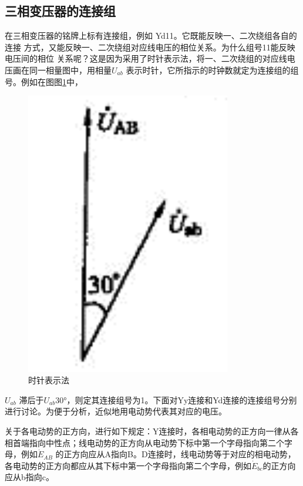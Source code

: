 \documentclass{book}
\begin{document}
\subsection{三相变压器的连接组}
在三相变压器的铭牌上标有连接组，例如 Yd11。它既能反映一、二次绕组各自的连接 方式，又能反映一、二次绕组对应线电压的相位关系。为什么组号11能反映电压间的相位 关系呢？这是因为采用了时针表示法，将一、二次绕组的对应线电压画在同一相量图中，用相量${{U}_{ab}}$ 表示时针，它所指示的时钟数就定为连接组的组号。例如在图图\ref{fig_4.5}中，
\begin{figure}[H]
	\centering
	\includegraphics[width=0.80\textwidth]{4-5.png}
	\caption{时针表示法}
	\label{fig_4.5}
\end{figure}
${{U}_{ab}}$ 滞后于${{U}_{ab}}$30°，则定其连接组号为1。下面对Yy连接和Yd连接的连接组号分别进行讨论。为便于分析，近似地用电动势代表其对应的电压。

关于各电动势的正方向，进行如下规定：Y连接时，各相电动势的正方向一律从各相首端指向中性点；线电动势的正方向从电动势下标中第一个字母指向第二个字母，例如${{\dot{E}}_{AB}}$ 的正方向应从A指向B。D连接时，线电动势等于对应的相电动势，各电动势的正方向都应从其下标中第一个字母指向第二个字母，例如${{\dot{E}}_{bc}}$的正方向应从b指向c。
\end{document}
